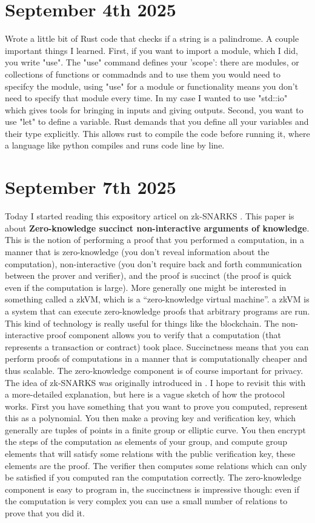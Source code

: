 \documentclass{amsart}
\theoremstyle{definition}
\begin{document}
\section{September 4th 2025}
Wrote a little bit of Rust code that checks if a string is a palindrome. A couple important things I learned. First, if you want to import a module, which I did, you write "use". The "use" command defines your 'scope': there are modules, or collections of functions or commadnds and to use them you would need to specifcy the module, using "use" for a module or functionality means you don't need to specify that module every time. In my case I wanted to use "std::io" which gives tools for bringing in inputs and giving outputs. Second, you want to use "let" to define a variable. Rust demands that you define all your variables and their type explicitly. This allows rust to compile the code before running it, where a language like python compiles and runs code line by line.



\section{September 7th 2025}

Today I started reading this expository articel on zk-SNARKS \cite{SnarksExpository}. This paper is about \textbf{Zero-knowledge succinct non-interactive arguments of knowledge}. This is the notion of performing a proof that you performed a computation, in a manner that is zero-knowledge (you don't reveal information about the computation), non-interactive (you don't require back and forth communication between the prover and verifier), and the proof is succinct (the proof is quick even if the computation is large). More generally one might be interested in something called a zkVM, which is a ``zero-knowledge virtual machine''. a zkVM is a system that can execute zero-knowledge proofs that arbitrary programs are run. This kind of technology is really useful for things like the blockchain. The non-interactive proof component allows you to verify that a computation (that represents a transaction or contract) took place. Succinctness means that you can perform proofs of computations in a manner that is computationally cheaper and thus scalable. The zero-knowledge component is of course important for privacy. The idea of zk-SNARKS was originally introduced in \cite{BCCT}. I hope to revisit this with a more-detailed explanation, but here is a vague sketch of how the protocol works. First you have something that you want to prove you computed, represent this as a polynomial. You then make a proving key and verification key, which generally are tuples of points in a finite group or elliptic curve. You then encrypt the steps of the computation as elements of your group, and compute group elements that will satisfy some relations with the public verification key, these elements are the proof. The verifier then computes some relations which can only be satisfied if you computed ran the computation correctly. The zero-knowledge component is easy to program in, the succinctness is impressive though: even if the computation is very complex you can use a small number of relations to prove that you did it.
\end{document}
